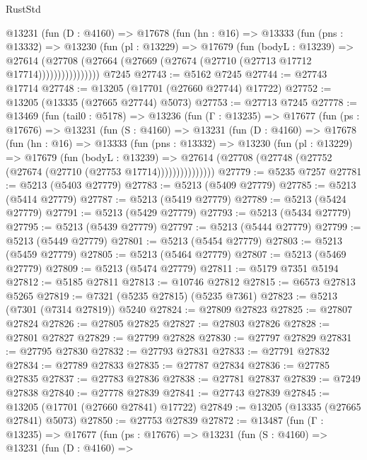 \begin{lexlean}{RustStd}
\begin{coremodule}
            @13231
              (fun (D : @4160) =>
              @17678
                (fun (hn : @16) =>
                @13333
                  (fun (pns : @13332) =>
                  @13230
                    (fun (pl : @13229) =>
                    @17679
                      (fun (bodyL : @13239) =>
                      @27614
                        (@27708
                          (@27664 (@27669 (@27674 (@27710 (@27713 @17712 @17714))))))))))))))))
    @7245
@27743 := @5162 @7245
@27744 := @27743 @17714
@27748 := @13205 (@17701 (@27660 @27744) @17722)
@27752 := @13205 (@13335 (@27665 @27744) @5073)
@27753 := @27713 @7245
@27778 := @13469
    (fun (tail0 : @5178) =>
    @13236
      (fun (Γ : @13235) =>
      @17677
        (fun (ps : @17676) =>
        @13231
          (fun (S : @4160) =>
          @13231
            (fun (D : @4160) =>
            @17678
              (fun (hn : @16) =>
              @13333
                (fun (pns : @13332) =>
                @13230
                  (fun (pl : @13229) =>
                  @17679
                    (fun (bodyL : @13239) =>
                    @27614 (@27708 (@27748 (@27752 (@27674 (@27710 (@27753 @17714)))))))))))))))
@27779 := @5235 @7257
@27781 := @5213 (@5403 @27779)
@27783 := @5213 (@5409 @27779)
@27785 := @5213 (@5414 @27779)
@27787 := @5213 (@5419 @27779)
@27789 := @5213 (@5424 @27779)
@27791 := @5213 (@5429 @27779)
@27793 := @5213 (@5434 @27779)
@27795 := @5213 (@5439 @27779)
@27797 := @5213 (@5444 @27779)
@27799 := @5213 (@5449 @27779)
@27801 := @5213 (@5454 @27779)
@27803 := @5213 (@5459 @27779)
@27805 := @5213 (@5464 @27779)
@27807 := @5213 (@5469 @27779)
@27809 := @5213 (@5474 @27779)
@27811 := @5179 @7351 @5194
@27812 := @5185 @27811
@27813 := @10746 @27812
@27815 := @6573 @27813 @5265
@27819 := @7321 (@5235 @27815) (@5235 @7361)
@27823 := @5213 (@7301 (@7314 @27819)) @5240
@27824 := @27809 @27823
@27825 := @27807 @27824
@27826 := @27805 @27825
@27827 := @27803 @27826
@27828 := @27801 @27827
@27829 := @27799 @27828
@27830 := @27797 @27829
@27831 := @27795 @27830
@27832 := @27793 @27831
@27833 := @27791 @27832
@27834 := @27789 @27833
@27835 := @27787 @27834
@27836 := @27785 @27835
@27837 := @27783 @27836
@27838 := @27781 @27837
@27839 := @7249 @27838
@27840 := @27778 @27839
@27841 := @27743 @27839
@27845 := @13205 (@17701 (@27660 @27841) @17722)
@27849 := @13205 (@13335 (@27665 @27841) @5073)
@27850 := @27753 @27839
@27872 := @13487
    (fun (Γ : @13235) =>
    @17677
      (fun (ps : @17676) =>
      @13231
        (fun (S : @4160) =>
        @13231
          (fun (D : @4160) =>

\end{coremodule}
\end{lexlean}
